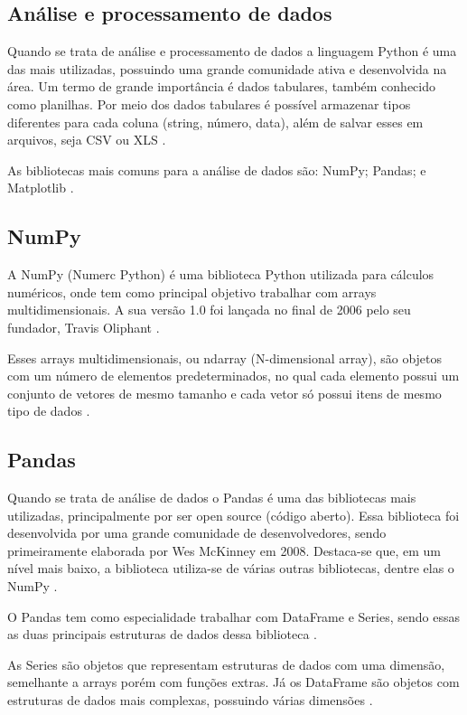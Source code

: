 \subsection{Análise e processamento de dados}

Quando se trata de análise e processamento de dados a linguagem Python é uma das mais utilizadas, possuindo uma grande comunidade ativa e desenvolvida na área. Um termo de grande importância é dados tabulares, também conhecido como planilhas. Por meio dos dados tabulares é possível armazenar tipos diferentes para cada coluna (string, número, data), além de salvar esses em arquivos, seja CSV ou XLS \cite{ref:mckinney_2022}.

As bibliotecas mais comuns para a análise de dados são: NumPy; Pandas; e Matplotlib \cite{ref:mckinney_2022}.

\subsection{NumPy}

A NumPy (Numerc Python) é uma biblioteca Python utilizada para cálculos numéricos, onde tem como principal objetivo trabalhar com arrays multidimensionais. A sua versão 1.0 foi lançada no final de 2006 pelo seu fundador, Travis Oliphant \cite{ref:oliphant_2006}.

Esses arrays multidimensionais, ou ndarray (N-dimensional array), são objetos com um número de elementos predeterminados, no qual cada elemento possui um conjunto de vetores de mesmo tamanho e cada vetor só possui itens de mesmo tipo de dados \cite{ref:nelli_2023}.

\subsection{Pandas}

Quando se trata de análise de dados o Pandas é uma das bibliotecas mais utilizadas, principalmente por ser open source (código aberto). Essa biblioteca foi desenvolvida por uma grande comunidade de desenvolvedores, sendo primeiramente elaborada por Wes McKinney em 2008.  Destaca-se que, em um nível mais baixo, a biblioteca utiliza-se de várias outras bibliotecas, dentre elas o NumPy \cite{ref:mckinney_2022}.

O Pandas tem como especialidade trabalhar com DataFrame e Series, sendo essas as duas principais estruturas de dados dessa biblioteca \cite{ref:nelli_2023}.

As Series são objetos que representam estruturas de dados com uma dimensão, semelhante a arrays porém com funções extras. Já os DataFrame são objetos com estruturas de dados mais complexas, possuindo várias dimensões \cite{ref:nelli_2023}.

